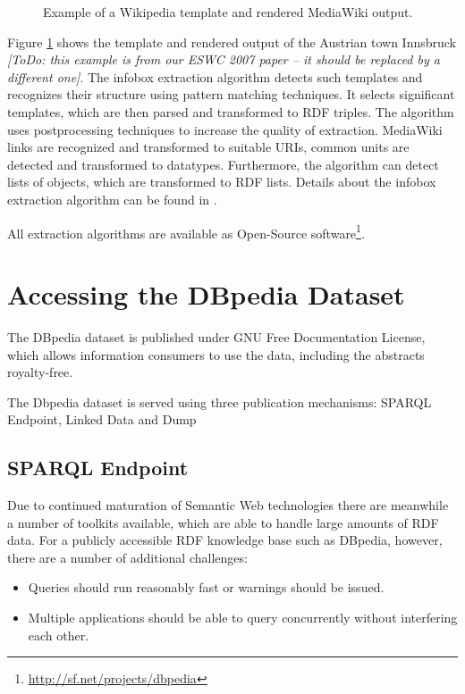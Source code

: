 \documentclass{llncs}
\begin{document}
\begin{figure}[tbp]
\begin{minipage}[b]{.42\linewidth}
\end{minipage}
\caption{Example of a Wikipedia template and rendered MediaWiki output.}
\label{fig:template}
\end{figure}

Figure \ref{fig:template} shows the template and rendered output of the Austrian town Innsbruck \emph{[ToDo: this example is from our ESWC 2007 paper -- it should be replaced by a different one]}. The infobox extraction algorithm detects such templates and recognizes their structure using pattern matching techniques. It selects significant templates, which are then parsed and transformed to RDF triples. The algorithm uses postprocessing techniques to increase the quality of extraction. MediaWiki links are recognized and transformed to suitable URIs, common units are detected and transformed to datatypes. Furthermore, the algorithm can detect lists of objects, which are transformed to RDF lists. Details about the infobox extraction algorithm can be found in \cite{DBLP:conf/esws/AuerL07}.

All extraction algorithms are available as Open-Source software\footnote{\url{http://sf.net/projects/dbpedia}}.


\section{Accessing the DBpedia Dataset}

The DBpedia dataset is published under GNU Free Documentation License, which allows information consumers to use the data, including the abstracts royalty-free.

The Dbpedia dataset is served using three publication mechanisms: SPARQL Endpoint, Linked Data and Dump

\subsection{SPARQL Endpoint}

Due to continued maturation of Semantic Web technologies there are meanwhile a number of toolkits available, which are able to handle large amounts of RDF data. For a publicly accessible RDF knowledge base such as DBpedia, however, there are a number of additional challenges:

\begin{itemize}
	\item Queries should run reasonably fast or warnings should be issued.
	\item Multiple applications should be able to query concurrently without interfering each other.
\end{itemize}
\end{document}
